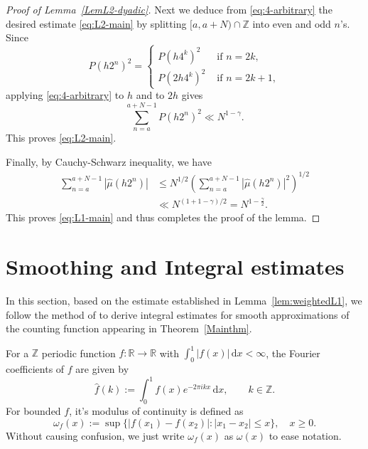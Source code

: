 \documentclass[amssymb,amsfonts,refcheck,12pt,verbatim,righttag]{amsart}
\numberwithin{equation}{section} %
\newcommand{\Z}{\mathbb{Z}}
\theoremstyle{plain}
\begin{document}
\begin{proof}[Proof of Lemma~\ref{LemL2-dyadic}]
Next we deduce from \eqref{eq:4-arbitrary} the desired estimate \eqref{eq:L2-main} by splitting $[a,a+N)\cap\mathbb{Z}$ into even and odd $n$'s.   Since 
	\[
	P(h2^n)^2=\begin{cases}P(h4^k)^2 & \text{ if } n=2k,\\
	P(2h4^k)^2 &\text{ if } n=2k+1,
	\end{cases}
	\]
 applying \eqref{eq:4-arbitrary} to $h$ and to $2h$ gives
\begin{equation*}
\sum_{n=a}^{a+N-1}P(h2^n)^2\ll N^{1-\gamma}.
\end{equation*}
This proves \eqref{eq:L2-main}.
	
Finally, by Cauchy-Schwarz inequality, we have 
	\[
	\begin{aligned}
		\sum_{n=a}^{a+N-1}|\widehat\mu(h2^n)|
		&\leq N^{1/2}
		\left(\sum_{n=a}^{a+N-1}|\widehat\mu(h2^n)|^2\right)^{1/2} \\
		&\ll N^{(1+1-\gamma)/2}=N^{1-\frac{\gamma}{2}}.
	\end{aligned}
	\]
	This proves \eqref{eq:L1-main} and thus completes the proof of the lemma.
\end{proof}

 


















\section{Smoothing and Integral estimates}\label{S3}


In this section, based on the estimate established in %
Lemma~\ref{lem:weightedL1},  we follow the method of \cite[Section 2.2]{Baker25A} to  derive integral estimates for smooth approximations of the counting function appearing in Theorem~\ref{Mainthm}.  

For a $\mathbb{Z}$ periodic function $f:\mathbb{R}\to\mathbb{R}$ with $\int_{0}^{1}|f(x)|\, \mathrm{d} x<\infty$, the Fourier coefficients of $f$ are given by 
\begin{equation*}
	\label{Fouriertransform2}
	\widehat{f}(k):=\int_{0}^{1}f(x)e^{-2\pi i k x}\, \mathrm{d} x,  \qquad k\in\Z.
\end{equation*}  
For bounded $f$, it's modulus of continuity is defined as
$$\omega_{f}(x):=\sup\{|f(x_{1})-f(x_{2})|:|x_{1}-x_{2}|\leq x\},\quad x\geq0.$$
Without causing confusion, we just write $\omega_{f}(x)$ as $\omega(x)$ to ease notation.
\end{document}
